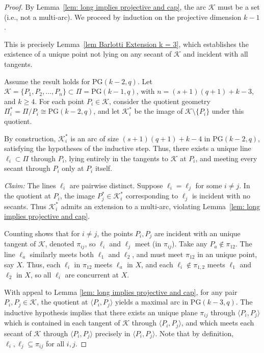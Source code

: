 \documentclass[letterpaper, 12pt]{article}
\newcommand{\K}{\mathcal{K}}
\begin{document}
\begin{proof}
	By Lemma~\ref{lem: long implies projective and cap}, the arc \( \K \) must be a set (i.e., not a multi-arc). We proceed by induction on the projective dimension \( k - 1 \).
	
	\smallskip
	\noindent {} This is precisely Lemma~\ref{lem Barlotti Extension k = 3}, which establishes the existence of a unique point not lying on any secant of \( \K \) and incident with all tangents.
	
	\smallskip
	Assume the result holds for PG\((k-2, q)\). Let \( \K = \{P_1, P_2, \ldots, P_n\} \subset \Pi = \text{PG}(k-1, q) \), with \( n = (s+1)(q+1) + k - 3 \), and \( k \ge 4 \). For each point \( P_i \in \K \), consider the quotient geometry \( \Pi^*_i = \Pi / P_i \cong \text{PG}(k - 2, q) \), and let \( \K_i^* \) be the image of \( \K \setminus \{P_i\} \) under this quotient.
	
	By construction, \( \K_i^* \) is an arc of size \( (s+1)(q+1) + k - 4 \) in PG\((k - 2, q)\), satisfying the hypotheses of the inductive step. Thus, there exists a unique line \( \ell_i \subset \Pi \) through \( P_i \), lying entirely in the tangents to \( \K \) at \( P_i \), and meeting every secant through \( P_i \) only at \( P_i \) itself.
	
	\smallskip
	\noindent \textit{Claim:} The lines \( \ell_i \) are pairwise distinct. Suppose \( \ell_i = \ell_j \) for some \( i \ne j \). In the quotient at \( P_i \), the image \( P_j^* \in \K_i^* \) corresponding to $\ell_j$ is incident with no secants. Thus $\K_i^*$ admits an extension to a multi-arc, violating Lemma~\ref{lem: long implies projective and cap}. 
	
	\smallskip
	\noindent {} Counting shows that for $i\ne j$, the points $P_i,P_j$ are incident with an unique tangent of $\K$, denoted $\pi_{ij}$, so $\ell_i$ and $\ell_j$ meet (in $\pi_{ij}$). Take any $P_a \notin \pi_{12}$. The line $\ell_a$ similarly meets both $\ell_1$ and $\ell_2$, and must meet $\pi_{12}$ in an unique point, say $X$.  Thus, each $\ell_i$ in $\pi_{12}$ meets $\ell_a$ in $X$, and each $\ell_i\notin \pi_{1,2}$ meets $\ell_1$ and $\ell_2$ in $X$, so all \( \ell_i \) are concurrent at \( X \).
	
	\smallskip
	\noindent {} With appeal to Lemma \ref{lem: long implies projective and cap}, for any pair \( P_i, P_j \in \K \), the quotient at \( \langle P_i, P_j \rangle \) yields a maximal arc in PG\((k-3, q)\). The inductive hypothesis implies that  there exists an unique plane $\pi_{ij}$ through $\langle P_i,P_j\rangle $ which is contained in each tangent of $\K$ through $\langle P_i,P_j\rangle $, and which meets each secant of $\K$ through $\langle P_i,P_j\rangle $ precisely in $\langle P_i,P_j\rangle $.  Note that by definition, $\ell_i,\ell_j \subseteq \pi_{ij}$ for all $i,j$.	
	

\end{proof}
\end{document}
